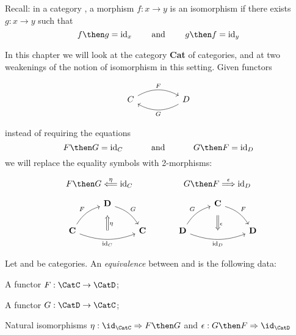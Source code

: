 
Recall: in a category \CatC, a morphism $f: x \rightarrow y$ is an isomorphism if there exists $g : x \rightarrow y$ such that
\[
    f \then g = \text{id}_x \quad \quad \text{ and } \quad \quad g \then f = \text{id}_y
\]


In this chapter we will look at the category \textbf{Cat} of categories, and at two weakenings of the notion of isomorphism in this setting.
Given functors

\[\begin{tikzcd}
      C && D
      \arrow["F", bend left=30, from=1-1, to=1-3]
      \arrow["G", bend left=30, from=1-3, to=1-1]
\end{tikzcd}\]

instead of requiring the equations
\[
    F \then G = \text{id}_C  \quad \quad \quad  \text{ and } \quad \quad \quad G \then F = \text{id}_D
\]
we will replace the equality symbols with 2-morphisms:
\

\[
    F \then G \overset{\eta}{\Longleftarrow} \text{id}_C  \quad \quad \quad \quad \quad \quad G \then F \overset{\epsilon}{\Longrightarrow} \text{id}_D
\]


\[
    \quad
    \begin{tikzcd}
        & {\mathbf{D}} \\
        {\mathbf{C}} && {\mathbf{C}}
        \arrow["F", bend left=20, from=2-1, to=1-2]
        \arrow["G", bend left=20, from=1-2, to=2-3]
        \arrow[""{name=0, anchor=center, inner sep=0}, "{\text{id}_C}"', bend right=20, from=2-1, to=2-3]
        \arrow["\eta", shorten <=7pt, shorten >=10pt, Leftarrow, from=1-2, to=0]
    \end{tikzcd}
    \quad \quad \quad
    \begin{tikzcd}
        & {\mathbf{C}} \\
        {\mathbf{D}} && {\mathbf{D}}
        \arrow["G", bend left=20, from=2-1, to=1-2]
        \arrow["F", bend left=20, from=1-2, to=2-3]
        \arrow[""{name=0, anchor=center, inner sep=0}, "{\text{id}_D}"', bend right=20, from=2-1, to=2-3]
        \arrow["\epsilon", shorten <=7pt, shorten >=10pt, Rightarrow, from=1-2, to=0]
    \end{tikzcd}
\]

\begin{ctdefinition}[]
    \label{def:cat-equivalence}
    Let \CatC and \CatD be categories. An \emph{equivalence} between \CatC and \CatD is the following data:
    \begin{compactenum}
        \item A functor $F:  \CatC \rightarrow \CatD$;
        \item A functor $G: \CatD \rightarrow \CatC $;
        \item Natural isomorphisms $\eta : \id_\CatC \Rightarrow F \then G$ and $\epsilon : G \then F \Rightarrow \id_\CatD$
    \end{compactenum}
\end{ctdefinition}


